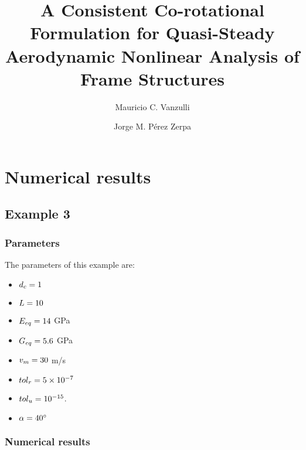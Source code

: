 \documentclass[3p,a4paper,11pt,review]{elsarticle}
\begin{document}
	
	
	\begin{frontmatter}
		
		\title{A Consistent Co-rotational Formulation for Quasi-Steady Aerodynamic Nonlinear Analysis of Frame Structures}
		
		\author[1]{Mauricio C. Vanzulli}
		\author[2]{Jorge M. Pérez Zerpa}
		
		\address[1]{Instituto de Ingeniería Mecánica y Producción Industrial, Facultad de Ingeniería, Universidad de la República, Montevideo, Uruguay}
		
		\address[2]{Instituto de Estructuras y Transporte, Facultad de Ingeniería, Universidad de la República, Montevideo, Uruguay}  
		
	\end{frontmatter}


\section{Numerical results}





\subsection{Example 3}


\subsubsection{Parameters}
The parameters of this example are:

\begin{itemize}
	\item $d_c= 1$ 
	\item $L = 10$
	\item $E_{eq} = 14$ GPa
	\item $G_{eq} = 5.6$ GPa
	\item $v_{m} = 30$ m/s
	\item $tol_r = 5\times 10^{-7}$
	\item $tol_u = 10^{-15}$.
	\item $\alpha = 40^{\circ}$
\end{itemize}


\subsubsection{Numerical results}
\end{document}
